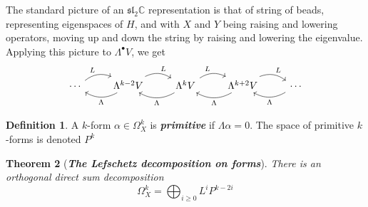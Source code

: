 \documentclass[psamsfonts, 12pt]{amsart}
\newtheorem{thm}{Theorem}[section]
\theoremstyle{definition}
\newtheorem{defn}[thm]{Definition}
\theoremstyle{remark}
\renewcommand{\sl}{\mathfrak{sl}}
\newcommand{\ib}[1]{\textbf{\textit{#1}}}
\newcommand{\C}{\mathbb{C}}
\begin{document}
%
The standard picture of an $\sl_2\C$ representation is that of string of beads,
representing eigenspaces of $H$, and with $X$ and $Y$ being raising and lowering
operators, moving up and down the string by raising and lowering the eigenvalue.
Applying this picture to $\Lambda^\bullet V$, we get
\[\begin{tikzcd}
\cdots \ar[r, bend left=30, "L"]& \Lambda^{k-2}V \ar[r, bend left=30, "L"]
\ar[l, bend left=30, "\Lambda"] & \Lambda^kV \ar[l, bend left=30, "\Lambda"]
\ar[r, bend left=30, "L"]& \Lambda^{k+2}V \ar[l, bend left=30, "\Lambda"]
\ar[r, bend left=30, "L"]& \cdots \ar[l, bend left=30, "\Lambda"]
\end{tikzcd}\]
%
\begin{defn}
A $k$-form $\alpha \in \Omega^k_X$ is \ib{primitive} if $\Lambda\alpha = 0$. The space
of primitive $k$-forms is denoted $P^k$
\end{defn}
%
\begin{thm}[\ib{The Lefschetz decomposition on forms}]
There is an orthogonal direct sum decomposition
\[
\Omega^k_X = \bigoplus_{i \geq 0 } L^iP^{k-2i}
\]
\end{thm}
%
\end{document}
